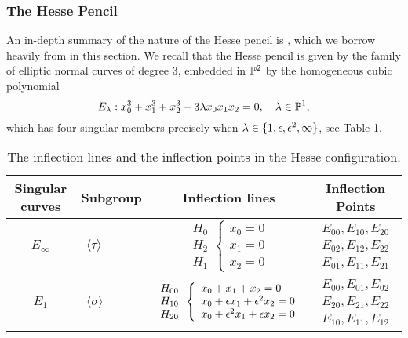 \subsubsection{The Hesse Pencil}
\label{Hesse_example}
An in-depth summary of the nature of the Hesse pencil is \cite{Dolgachev_2006}, which we borrow heavily from in this section.
We recall that the Hesse pencil is given by the family of elliptic normal curves of degree 3, embedded in $\mathbb{P}^{2}$ by the homogeneous cubic polynomial
\begin{equation*}
E_{\lambda}: x_{0}^{3} + x_{1}^{3} + x_{2}^{3} - 3\lambda x_{0}x_{1}x_{2} = 0,\quad \lambda \in \mathbb{P}^{1},
\end{equation*}
which has four singular members precisely when $\lambda \in \{1,\epsilon,\epsilon^{2},\infty\}$, see Table \ref{tab:Hesseconfig}.
\begin{table}[h!]
	\renewcommand{\arraystretch}{1.2}
	\begin{center}
		\caption{The inflection lines and the inflection points in the Hesse configuration.}
		\begin{tabular}{clcc}\label{tab:Hesseconfig}
			\\\HLINE
			Singular curves&Subgroup&Inflection lines&Inflection Points\\\hline
			$E_{\infty}$&$\left.\begin{array}{l} \\ \langle\tau\rangle \\ \end{array}\right.$&
			$\begin{array}{l}H_{0}\\H_{2}\\H_{1} \end{array}\left\{\begin{array}{l}x_0=0\\x_1=0\\x_2=0\end{array}\right.$&
			$\begin{array}{l}E_{00},E_{10},E_{20}\\E_{02},E_{12},E_{22}\\E_{01},E_{11},E_{21}\end{array}$ \\\hline 
			$E_{1}$&
			$\left.\begin{array}{l} \\ \langle\sigma\rangle \\ \end{array}\right.$&
			$\begin{array}{l}H_{00}\\H_{10}\\H_{20} \end{array}\left\{\begin{array}{l}x_0+x_1+x_2=0\\x_0+\epsilon x_1+\epsilon^{2}x_2=0\\x_0+\epsilon^{2}x_1+\epsilon x_2=0\end{array}\right.$&$\begin{array}{l}E_{00},E_{01},E_{02}\\E_{20},E_{21},E_{22}\\E_{10},E_{11},E_{12} \end{array}$  \\\hline

\end{tabular}
\end{center}
\end{table}
